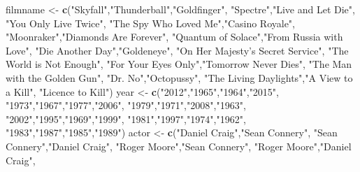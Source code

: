 \documentclass[
]{book}
\newenvironment{Shaded}{\begin{snugshade}}{\end{snugshade}}
\newcommand{\KeywordTok}[1]{\textcolor[rgb]{0.13,0.29,0.53}{\textbf{#1}}}
\newcommand{\NormalTok}[1]{#1}
\newcommand{\StringTok}[1]{\textcolor[rgb]{0.31,0.60,0.02}{#1}}
\begin{document}
\begin{Shaded}
\begin{Highlighting}[]
\NormalTok{filmname <-}\StringTok{ }
\StringTok{      }\KeywordTok{c}\NormalTok{(}\StringTok{"Skyfall"}\NormalTok{,}\StringTok{"Thunderball"}\NormalTok{,}\StringTok{"Goldfinger"}\NormalTok{,}
        \StringTok{"Spectre"}\NormalTok{,}\StringTok{"Live and Let Die"}\NormalTok{,}
        \StringTok{"You Only Live Twice"}\NormalTok{,}
        \StringTok{"The Spy Who Loved Me"}\NormalTok{,}\StringTok{"Casino Royale"}\NormalTok{,}
        \StringTok{"Moonraker"}\NormalTok{,}\StringTok{"Diamonds Are Forever"}\NormalTok{,}
        \StringTok{"Quantum of Solace"}\NormalTok{,}\StringTok{"From Russia with Love"}\NormalTok{,}
        \StringTok{"Die Another Day"}\NormalTok{,}\StringTok{"Goldeneye"}\NormalTok{,}
        \StringTok{"On Her Majesty's Secret Service"}\NormalTok{,}
        \StringTok{"The World is Not Enough"}\NormalTok{,}
        \StringTok{"For Your Eyes Only"}\NormalTok{,}\StringTok{"Tomorrow Never Dies"}\NormalTok{,}
        \StringTok{"The Man with the Golden Gun"}\NormalTok{,}
        \StringTok{"Dr. No"}\NormalTok{,}\StringTok{"Octopussy"}\NormalTok{,}
        \StringTok{"The Living Daylights"}\NormalTok{,}\StringTok{"A View to a Kill"}\NormalTok{,}
        \StringTok{"Licence to Kill"}\NormalTok{)}
\NormalTok{year <-}\StringTok{ }\KeywordTok{c}\NormalTok{(}\StringTok{"2012"}\NormalTok{,}\StringTok{"1965"}\NormalTok{,}\StringTok{"1964"}\NormalTok{,}\StringTok{"2015"}\NormalTok{,}
          \StringTok{"1973"}\NormalTok{,}\StringTok{"1967"}\NormalTok{,}\StringTok{"1977"}\NormalTok{,}\StringTok{"2006"}\NormalTok{,}
          \StringTok{"1979"}\NormalTok{,}\StringTok{"1971"}\NormalTok{,}\StringTok{"2008"}\NormalTok{,}\StringTok{"1963"}\NormalTok{,}
          \StringTok{"2002"}\NormalTok{,}\StringTok{"1995"}\NormalTok{,}\StringTok{"1969"}\NormalTok{,}\StringTok{"1999"}\NormalTok{,}
          \StringTok{"1981"}\NormalTok{,}\StringTok{"1997"}\NormalTok{,}\StringTok{"1974"}\NormalTok{,}\StringTok{"1962"}\NormalTok{,}
          \StringTok{"1983"}\NormalTok{,}\StringTok{"1987"}\NormalTok{,}\StringTok{"1985"}\NormalTok{,}\StringTok{"1989"}\NormalTok{)}
\NormalTok{actor <-}\StringTok{ }\KeywordTok{c}\NormalTok{(}\StringTok{"Daniel Craig"}\NormalTok{,}\StringTok{"Sean Connery"}\NormalTok{,}
           \StringTok{"Sean Connery"}\NormalTok{,}\StringTok{"Daniel Craig"}\NormalTok{,}
           \StringTok{"Roger Moore"}\NormalTok{,}\StringTok{"Sean Connery"}\NormalTok{,}
           \StringTok{"Roger Moore"}\NormalTok{,}\StringTok{"Daniel Craig"}\NormalTok{,}

\end{Highlighting}
\end{Shaded}
\end{document}
